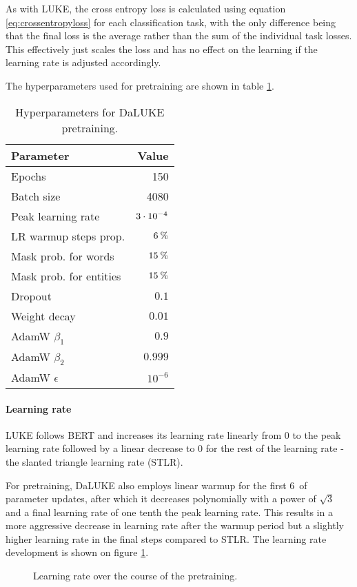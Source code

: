 \documentclass[main.tex]{subfiles}
\begin{document}
As with LUKE, the cross entropy loss is calculated using equation \ref{eq:crossentropyloss} for each classification task, with the only difference being that the final loss is the average rather than the sum of the individual task losses.
This effectively just scales the loss and has no effect on the learning if the learning rate is adjusted accordingly.

The hyperparameters used for pretraining are shown in table \ref{tab:pretrain-hyper}.
\begin{table}[H]
    \centering
    \begin{tabular}{l|r}
        Parameter  &    Value\\\hline
        Epochs     & 150\\
        Batch size &    4080\\
        Peak learning rate & $3\cdot10^{-4}$\\
        LR warmup steps prop. & $ 6\:\text{\%{}} $\\
        Mask prob. for words & $ 15\:\text{\%{}} $\\
        Mask prob. for entities & $ 15\:\text{\%{}} $\\
        Dropout & $ 0.1 $\\
        Weight decay & $ 0.01 $\\
        AdamW $ \beta_1 $ & $ 0.9 $\\
        AdamW $ \beta_2 $ & $ 0.999 $\\
        AdamW $ \epsilon $ & $ 10^{-6} $
    \end{tabular}
    \caption{Hyperparameters for DaLUKE pretraining.}\label{tab:pretrain-hyper}
\end{table}\noindent

\paragraph{Learning rate}
LUKE follows BERT and increases its learning rate linearly from 0 to the peak learning rate followed by a linear decrease to 0 for the rest of the learning rate - the slanted triangle learning rate (STLR). \cite{devlin2019bert} \cite{yamada2020luke} \cite{howardruder2018universal}

For pretraining, DaLUKE also employs linear warmup for the first 6\pro\ of parameter updates, after which it decreases polynomially with a power of $ \sqrt{3} $ and a final learning rate of one tenth the peak learning rate.
This results in a more aggressive decrease in learning rate after the warmup period but a slightly higher learning rate in the final steps compared to STLR.
The learning rate development is shown on figure \ref{fig:lr}.
\begin{figure}[H]
    \centering
    \caption{Learning rate over the course of the pretraining.}
    \label{fig:lr}
\end{figure}\noindent
\end{document}
